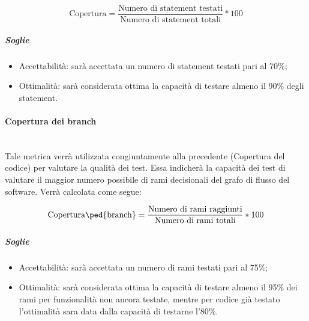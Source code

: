 	\begin{displaymath}
		\mbox{Copertura} =\frac{\mbox{Numero di statement testati}}{\mbox{Numero di statement totali}} * 100
	\end{displaymath}	
	
\subparagraph{Soglie}
	\begin{itemize}
	\item Accettabilità: sarà accettata un numero di statement testati pari al 70\%;
	\item Ottimalità: sarà considerata ottima la capacità di testare almeno il 90\% degli statement.
	\end{itemize}
	

\paragraph{Copertura dei branch}
	~\\Tale metrica verrà utilizzata congiuntamente alla precedente (Copertura del codice) per valutare la qualità dei test. Essa indicherà la capacità dei test di valutare il maggior numero possibile di rami decisionali del grafo di flusso del software. Verrà calcolata come segue:

	\begin{displaymath}
		\mbox{Copertura\ped{branch}} =\frac{\mbox{Numero di rami raggiunti}}{\mbox{Numero di rami totali}} * 100
	\end{displaymath}	
	
	\subparagraph{Soglie}
	\begin{itemize}
	\item Accettabilità: sarà accettata un numero di rami testati pari al 75\%;
	\item Ottimalità: sarà considerata ottima la capacità di testare almeno il 95\% dei rami per funzionalità non ancora testate, mentre per codice già testato l'ottimalità sara data dalla capacità di testarne l'80\%.
	\end{itemize}
